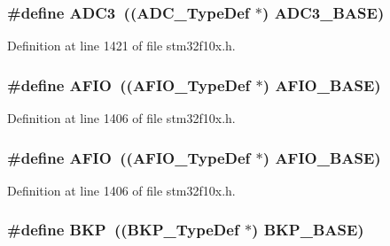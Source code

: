 \subsubsection[{\texorpdfstring{A\+D\+C3}{ADC3}}]{\setlength{\rightskip}{0pt plus 5cm}\#define A\+D\+C3~(({\bf A\+D\+C\+\_\+\+Type\+Def} $\ast$) {\bf A\+D\+C3\+\_\+\+B\+A\+SE})}\hypertarget{group___peripheral__declaration_gae917784606daf6b04c9b7b96b40c2f74}{}\label{group___peripheral__declaration_gae917784606daf6b04c9b7b96b40c2f74}


Definition at line 1421 of file stm32f10x.\+h.

\subsubsection[{\texorpdfstring{A\+F\+IO}{AFIO}}]{\setlength{\rightskip}{0pt plus 5cm}\#define A\+F\+IO~(({\bf A\+F\+I\+O\+\_\+\+Type\+Def} $\ast$) {\bf A\+F\+I\+O\+\_\+\+B\+A\+SE})}\hypertarget{group___peripheral__declaration_ga582e09473429414015b1de90cf767fa8}{}\label{group___peripheral__declaration_ga582e09473429414015b1de90cf767fa8}


Definition at line 1406 of file stm32f10x.\+h.

\subsubsection[{\texorpdfstring{A\+F\+IO}{AFIO}}]{\setlength{\rightskip}{0pt plus 5cm}\#define A\+F\+IO~(({\bf A\+F\+I\+O\+\_\+\+Type\+Def} $\ast$) {\bf A\+F\+I\+O\+\_\+\+B\+A\+SE})}\hypertarget{group___peripheral__declaration_ga582e09473429414015b1de90cf767fa8}{}\label{group___peripheral__declaration_ga582e09473429414015b1de90cf767fa8}


Definition at line 1406 of file stm32f10x.\+h.

\subsubsection[{\texorpdfstring{B\+KP}{BKP}}]{\setlength{\rightskip}{0pt plus 5cm}\#define B\+KP~(({\bf B\+K\+P\+\_\+\+Type\+Def} $\ast$) {\bf B\+K\+P\+\_\+\+B\+A\+SE})}\hypertarget{group___peripheral__declaration_gaa38716de06974ea948ad34ef7bfee00b}{}\label{group___peripheral__declaration_gaa38716de06974ea948ad34ef7bfee00b}


